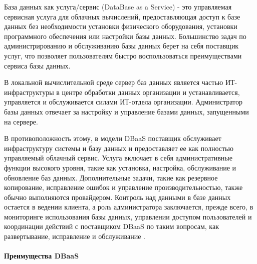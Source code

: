 База данных как услуга/сервис (DataBase as a Service) - это управляемая сервисная услуга для облачных вычислений, 
предоставляющая доступ к базе данных без необходимости установки физического оборудования, установки программного обеспечения 
или настройки базы данных. Большинство задач по администрированию и обслуживанию базы данных берет на себя поставщик услуг, 
что позволяет пользователям быстро воспользоваться преимуществами сервиса базы данных.

В локальной вычислительной среде сервер баз данных является частью ИТ-инфраструктуры в центре обработки данных организации и устанавливается, 
управляется и обслуживается силами ИТ-отдела организации. Администратор базы данных отвечает за настройку и управление базами данных, 
запущенными на сервере.

В противоположность этому, в модели DBaaS поставщик обслуживает инфраструктуру системы и базу данных и предоставляет ее как полностью 
управляемый облачный сервис. Услуга включает в себя административные функции высокого уровня, такие как установка, настройка, обслуживание 
и обновление баз данных. Дополнительные задачи, такие как резервное копирование, исправление ошибок и управление производительностью, также 
обычно выполняются провайдером. Контроль над данными в базе данных остается в ведении клиента, а роль администратора заключается, прежде всего, в мониторинге использования базы данных,
управлении доступом пользователей и координации действий с поставщиком DBaaS по таким вопросам, как развертывание, исправление и обслуживание \autocite{DBaaS}. 

\paragraph{Преимущества DBaaS}

